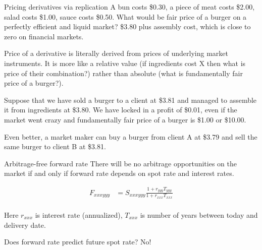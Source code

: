 \documentclass{beamer}
\begin{document}
\begin{frame}{Pricing derivatives via replication}
\justify
A bun costs \$0.30, a piece of meat costs \$2.00, salad costs \$1.00, sauce costs \$0.50. What would be fair price of a burger on a perfectly efficient and liquid market? \$3.80 plus assembly cost, which is close to zero on financial markets.

\justify
Price of a derivative is literally derived from prices of underlying market instruments. It is more like a relative value (if ingredients cost X then what is price of their combination?) rather than absolute (what is fundamentally fair price of a burger?).

\justify
Suppose that we have sold a burger to a client at \$3.81 and managed to assemble it from ingredients at \$3.80. We have locked in a profit of \$0.01, even if the market went crazy and fundamentally fair price of a burger is \$1.00 or \$10.00.

\justify
Even better, a market maker can buy a burger from client A at \$3.79 and sell the same burger to client B at \$3.81.
\end{frame}



\begin{frame}{Arbitrage-free forward rate}
\justify
There will be no arbitrage opportunities on the market if and only if forward rate depends on spot rate and interest rates.

\begin{align*}
F_{xxxyyy} &= S_{xxxyyy} \frac{1 + r_{yyy}T_{yyy}}{1 + r_{xxx}T_{xxx}} \\
\end{align*}

Here $r_{xxx}$ is interest rate (annualized), $T_{xxx}$ is number of years between today and delivery date.

\justify
Does forward rate predict future spot rate? No!
\end{frame}
\end{document}
